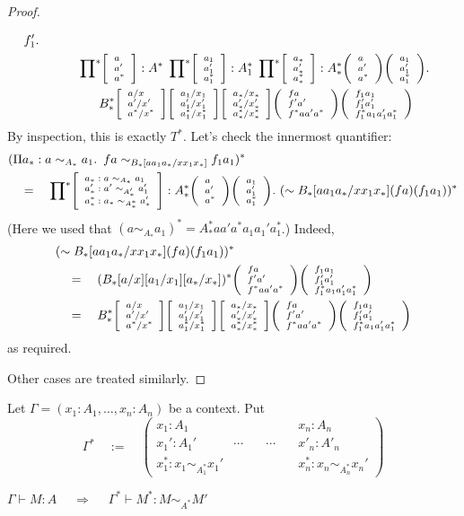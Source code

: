 \documentclass[10pt]{article}
\newcommand{\then}{\;\Longrightarrow\;}
\newcommand{\eq}{\quad=\quad}
\newcommand{\phan}{\phantom{\eq}\;}
\newcommand{\phanq}{\phantom{\eq\qquad}}
\newcommand{\hista}{\!\raisebox{1mm}{${}^*$}}
\newcommand{\trip}[3]{
{\scriptsize \left[
  \begin{array}{l}
    {#1}\\
    {#2}\\
    {#3}
  \end{array}
\right]}}
\newcommand{\tripar}[3]{
{\scriptsize \left(
  \begin{array}{l}
    {#1}\\
    {#2}\\
    {#3}
  \end{array}
\right)}}
\newcommand{\df}{\quad:=\quad}
\newenvironment{definition}{{\sc Definition.}}{}
\newenvironment{theorem}{{\sc Theorem.}}{}
\begin{document}
\begin{proof}
\begin{description}
\begin{align*}
{  f'_1}.\\
&\phan
\prod\hista \trip{a}{a'}{a^*} : A^*\;
\prod\hista \trip{a_1}{a_1'}{a_1^*} : A_1^*\;
\prod\hista \trip{a_*}{a_*'}{a_*^*} :
A_*^*  \tripar{a}{a'}{a^*} \tripar{a_1}{a'_1}{a^*_1}.\\
&\phanq
B^*_* \trip{a/x}{a'/x'}{a^*/x^*}
\trip{a_1/x_1}{a_1'/x_1'}{a_1^*/x_1^*}
\trip{a_*/x_*}{a_*'/x_*'}{a_*^*/x_*^*}
\tripar{f a}{f' a'}{f^* a a' a^*}
\tripar{f_1 a_1}{f'_1 a'_1}{f^*_1 a_1 a'_1 a^*_1}
\end{align*}
By inspection, this is exactly $T^*$.  Let's check the innermost
quantifier:
\begin{align*}
&(\Pi a_* : a \sim_{A_*} a_1 \st f a \sim_{B_* [a a_1 a_*/x x_1 x_*]}
  f_1 a_1)^*\\
&\eq \prod\hista \trip{a_* : a \sim_{A_*} a_1}
{a_*' : a' \sim_{A'_*} a'_1}
{a_*^* : a_* \sim_{A^*_*} a'_*} :
A^*_* \tripar{a}{a'}{a^*} \tripar{a_1}{a_1'}{a_1^*}.\ 
(\sim B_*[a a_1 a_*/x x_1 x_*] (f a) (f_1 a_1))^*
  \end{align*}
(Here we used that $(a \sim_{A_*} a_1)^* = A_*^* a a' a^* a_1 a_1'
a_1^*$.)
Indeed,
\begin{align*}
&(\sim B_*[a a_1 a_*/x x_1 x_*] (f a) (f_1 a_1))^*\\
&\eq (B_*[a/x][a_1/x_1][a_*/x_*])^* \tripar{f a}{f' a'}{f^* a a' a^*}
\tripar{f_1 a_1}{f_1' a_1'}{f_1^* a_1 a_1' a_1^*}\\
&\eq B_*^*\trip{a/x}{a'/x'}{a^*/x^*}
\trip{a_1/x_1}{a_1'/x_1'}{a_1^*/x_1^*}
\trip{a_*/x_*}{a_*'/x_*'}{a_*^*/x_*^*}
\tripar{f a}{f' a'}{f^* a a' a^*}
\tripar{f_1 a_1}{f'_1 a'_1}{f^*_1 a_1 a'_1 a^*_1}
\end{align*}
as required.
\end{description}
Other cases are treated similarly.
\end{proof}

\begin{definition}
  Let $\Gamma = (x_1 : A_1, \dots, x_n : A_n)$
be a context.  Put
\[ \Gamma^* \df \left(
  \begin{array}{cccc}
    x_1 : A_1 & \phantom{blue} && x_n : A_n\\
    x_1' : A_1' &\cdots& \cdots& x'_n : A'_n\\
    x_1^* : x_1 \sim_{A_1^*} x_1' &&\phantom{blue}& x_n^* : x_n \sim_{A_n^*} x_n'
  \end{array}\right)\]
\end{definition}

\newpage
\begin{theorem}
\qquad\qquad$\Gamma \vdash M : A \quad \then \quad \Gamma^* \vdash M^* : M
\sim_{A^*} M'$
\end{theorem}
\end{document}
